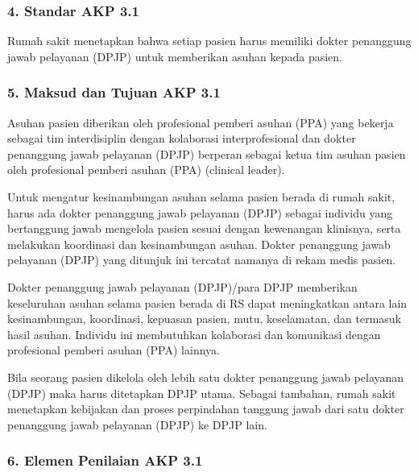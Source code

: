 \documentclass[
]{book}
\begin{document}
\hypertarget{standar-akp-3.1}{%
\subsubsection*{4. Standar AKP 3.1}\label{standar-akp-3.1}}

Rumah sakit menetapkan bahwa setiap pasien harus memiliki dokter penanggung jawab pelayanan (DPJP) untuk memberikan asuhan kepada pasien.

\hypertarget{maksud-dan-tujuan-akp-3.1}{%
\subsubsection*{5. Maksud dan Tujuan AKP 3.1}\label{maksud-dan-tujuan-akp-3.1}}

Asuhan pasien diberikan oleh profesional pemberi asuhan (PPA) yang bekerja sebagai tim interdisiplin dengan kolaborasi interprofesional dan dokter penanggung jawab pelayanan (DPJP) berperan sebagai ketua tim asuhan pasien oleh profesional pemberi asuhan (PPA) (clinical leader).

Untuk mengatur kesinambungan asuhan selama pasien berada di rumah sakit, harus ada dokter penanggung jawab pelayanan (DPJP) sebagai individu yang bertanggung jawab mengelola pasien sesuai dengan kewenangan klinisnya, serta melakukan koordinasi dan kesinambungan asuhan. Dokter penanggung jawab pelayanan (DPJP) yang ditunjuk ini tercatat namanya di rekam medis pasien.

Dokter penanggung jawab pelayanan (DPJP)/para DPJP memberikan keseluruhan asuhan selama pasien berada di RS dapat meningkatkan antara lain kesinambungan, koordinasi, kepuasan pasien, mutu, keselamatan, dan termasuk hasil asuhan. Individu ini membutuhkan kolaborasi dan komunikasi dengan profesional pemberi asuhan (PPA) lainnya.

Bila seorang pasien dikelola oleh lebih satu dokter penanggung jawab pelayanan (DPJP) maka harus ditetapkan DPJP utama. Sebagai tambahan, rumah sakit menetapkan kebijakan dan proses perpindahan tanggung jawab dari satu dokter penanggung jawab pelayanan (DPJP) ke DPJP lain.

\hypertarget{elemen-penilaian-akp-3.1}{%
\subsubsection*{6. Elemen Penilaian AKP 3.1}\label{elemen-penilaian-akp-3.1}}
\end{document}
